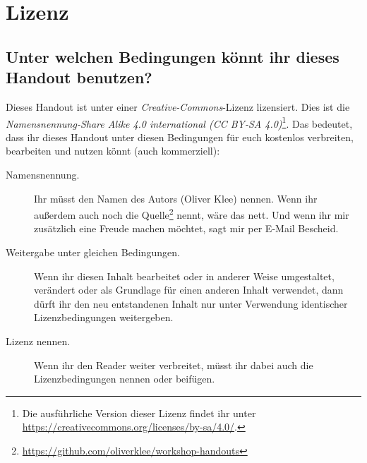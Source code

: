 \chapter{Lizenz}

\section*{Unter welchen Bedingungen könnt ihr dieses Handout benutzen?}
Dieses Handout ist unter einer \emph{Creative-Commons}-Lizenz lizensiert. Dies ist die \emph{Namensnennung-Share Alike 4.0 international (CC BY-SA 4.0)}\footnote{Die ausführliche Version dieser Lizenz findet ihr unter \url{https://creativecommons.org/licenses/by-sa/4.0/}.}. Das bedeutet, dass ihr dieses Handout unter diesen Bedingungen für euch kostenlos verbreiten, bearbeiten und nutzen könnt (auch kommerziell):

\begin{description}
  \item[Namensnennung.] Ihr müsst den Namen des Autors (Oliver Klee) nennen. Wenn ihr außerdem auch noch die Quelle\footnote{\url{https://github.com/oliverklee/workshop-handouts}} nennt, wäre das nett. Und wenn ihr mir zusätzlich eine Freude machen möchtet, sagt mir per E-Mail Bescheid.
  \item[Weitergabe unter gleichen Bedingungen.] Wenn ihr diesen Inhalt bearbeitet oder in anderer Weise umgestaltet, verändert oder als Grundlage für einen anderen Inhalt verwendet, dann dürft ihr den neu entstandenen Inhalt nur unter Verwendung identischer Lizenzbedingungen weitergeben.
  \item[Lizenz nennen.] Wenn ihr den Reader weiter verbreitet, müsst ihr dabei auch die Lizenzbedingungen nennen oder beifügen.
\end{description}
